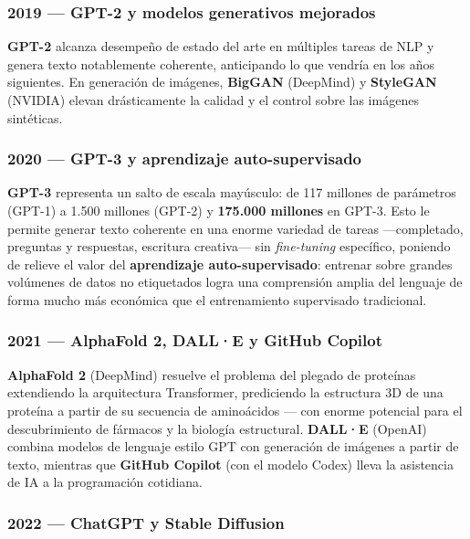 \documentclass[
  letterpaper,
  DIV=11,
  numbers=noendperiod]{scrartcl}
\begin{document}
\subsubsection{2019 --- GPT-2 y modelos generativos
mejorados}\label{gpt-2-y-modelos-generativos-mejorados}

\textbf{GPT-2} alcanza desempeño de estado del arte en múltiples tareas
de NLP y genera texto notablemente coherente, anticipando lo que vendría
en los años siguientes. En generación de imágenes, \textbf{BigGAN}
(DeepMind) y \textbf{StyleGAN} (NVIDIA) elevan drásticamente la calidad
y el control sobre las imágenes sintéticas.

\subsubsection{2020 --- GPT-3 y aprendizaje
auto-supervisado}\label{gpt-3-y-aprendizaje-auto-supervisado}

\textbf{GPT-3} representa un salto de escala mayúsculo: de 117 millones
de parámetros (GPT-1) a 1.500 millones (GPT-2) y \textbf{175.000
millones} en GPT-3. Esto le permite generar texto coherente en una
enorme variedad de tareas ---completado, preguntas y respuestas,
escritura creativa--- sin \emph{fine-tuning} específico, poniendo de
relieve el valor del \textbf{aprendizaje auto-supervisado}: entrenar
sobre grandes volúmenes de datos no etiquetados logra una comprensión
amplia del lenguaje de forma mucho más económica que el entrenamiento
supervisado tradicional.

\subsubsection{2021 --- AlphaFold 2, DALL·E y GitHub
Copilot}\label{alphafold-2-dalle-y-github-copilot}

\textbf{AlphaFold 2} (DeepMind) resuelve el problema del plegado de
proteínas extendiendo la arquitectura Transformer, prediciendo la
estructura 3D de una proteína a partir de su secuencia de aminoácidos
--- con enorme potencial para el descubrimiento de fármacos y la
biología estructural. \textbf{DALL·E} (OpenAI) combina modelos de
lenguaje estilo GPT con generación de imágenes a partir de texto,
mientras que \textbf{GitHub Copilot} (con el modelo Codex) lleva la
asistencia de IA a la programación cotidiana.

\subsubsection{2022 --- ChatGPT y Stable
Diffusion}\label{chatgpt-y-stable-diffusion}
\end{document}
